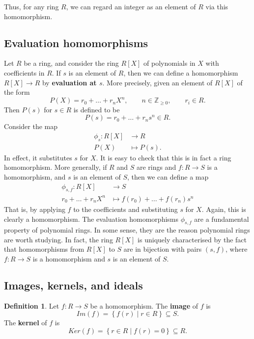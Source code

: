 \documentclass{article}
\newcommand{\Z}{\mathbb{Z}}
\newcommand{\rb}[1]{\left( #1 \right)}
\renewcommand{\sb}[1]{\left[ #1 \right]}
\newcommand{\cb}[1]{\left\{ #1 \right\}}
\theoremstyle{definition}\newtheorem{definition}{Definition}[subsection]
\theoremstyle{definition}\newtheorem{remark}[definition]{Remark}
\theoremstyle{definition}\newtheorem*{example}{Example}
\theoremstyle{definition}\newtheorem*{note}{Note}
\begin{document}
Thus, for any ring $ R $, we can regard an integer as an element of $ R $ via this homomorphism.

\subsection{Evaluation homomorphisms}

Let $ R $ be a ring, and consider the ring $ R\sb{X} $ of polynomials in $ X $ with coefficients in $ R $. If $ s $ is an element of $ R $, then we can define a homomorphism $ R\sb{X} \to R $ by \textbf{evaluation at $ s $}. More precisely, given an element of $ R\sb{X} $ of the form
$$ P\rb{X} = r_0 + \dots + r_nX^n, \qquad n \in \Z_{\ge 0}, \qquad r_i \in R. $$
Then $ P\rb{s} $ for $ s \in R $ is defined to be
$$ P\rb{s} = r_0 + \dots + r_ns^n \in R. $$
Consider the map
\begin{align*}
\phi_s : R\sb{X} & \to R \\
P\rb{X} & \mapsto P\rb{s}.
\end{align*}
In effect, it substitutes $ s $ for $ X $. It is easy to check that this is in fact a ring homomorphism. More generally, if $ R $ and $ S $ are rings and $ f : R \to S $ is a homomorphism, and $ s $ is an element of $ S $, then we can define a map
\begin{align*}
\phi_{s, f} : R\sb{X} & \to S \\
r_0 + \dots + r_nX^n & \mapsto f\rb{r_0} + \dots + f\rb{r_n}s^n
\end{align*}
That is, by applying $ f $ to the coefficients and substituting $ s $ for $ X $. Again, this is clearly a homomorphism. The evaluation homomorphisms $ \phi_{s, f} $ are a fundamental property of polynomial rings. In some sense, they are the reason polynomial rings are worth studying. In fact, the ring $ R\sb{X} $ is uniquely characterised by the fact that homomorphisms from $ R\sb{X} $ to $ S $ are in bijection with pairs $ \rb{s, f} $, where $ f : R \to S $ is a homomorphism and $ s $ is an element of $ S $.

\subsection{Images, kernels, and ideals}

\begin{definition}
Let $ f : R \to S $ be a homomorphism. The \textbf{image} of $ f $ is
$$ Im\rb{f} = \cb{f\rb{r} \mid r \in R} \subseteq S. $$
The \textbf{kernel} of $ f $ is
$$ Ker\rb{f} = \cb{r \in R \mid f\rb{r} = 0} \subseteq R. $$
\end{definition}
\end{document}
